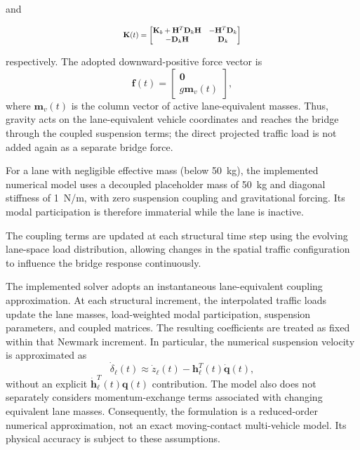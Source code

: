 \documentclass[journal]{IEEEtran}
\begin{document}
and

\begin{equation}
\scalebox{0.78}{$\displaystyle
\mathbf{K}(t)=
\begin{bmatrix}
\mathbf{K}_b+\mathbf{H}^{T}\mathbf{D}_k\mathbf{H}
&
-\mathbf{H}^{T}\mathbf{D}_k\\
-\mathbf{D}_k\mathbf{H}
&
\mathbf{D}_k
\end{bmatrix}
$}
\label{eq:assembled_stiffness}
\end{equation}

respectively. The adopted downward-positive force vector is
\begin{equation}
\mathbf{f}(t)=
\begin{bmatrix}
\mathbf{0}\\ g\mathbf{m}_v(t)
\end{bmatrix},
\label{eq:assembled_force}
\end{equation}
where $\mathbf{m}_v(t)$ is the column vector of active
lane-equivalent masses. Thus, gravity acts on the lane-equivalent
vehicle coordinates and reaches the bridge through the coupled
suspension terms; the direct projected traffic load is not added
again as a separate bridge force.

For a lane with negligible effective mass (below 50~kg),
the implemented numerical model uses a decoupled placeholder
mass of 50~kg and diagonal stiffness of 1~N/m, with zero
suspension coupling and gravitational forcing. Its modal
participation is therefore immaterial while the lane is inactive.


The coupling terms are updated at each structural time step using the evolving lane-space load distribution, allowing changes in the spatial traffic configuration to influence the bridge response continuously.


The implemented solver adopts an instantaneous lane-equivalent
coupling approximation. At each structural increment, the
interpolated traffic loads update the lane masses, load-weighted
modal participation, suspension parameters, and coupled matrices.
The resulting coefficients are treated as fixed within that
Newmark increment. In particular, the numerical suspension
velocity is approximated as
\begin{equation}
\dot{\delta}_{\ell}(t)\approx
\dot{z}_{\ell}(t)-
\mathbf{h}_{\ell}^{T}(t)\dot{\mathbf{q}}(t),
\label{eq:reduced_velocity_approx}
\end{equation}
without an explicit
$\dot{\mathbf{h}}_{\ell}^{T}(t)\mathbf{q}(t)$ contribution.
The model also does not separately considers momentum-exchange
terms associated with changing equivalent lane masses.
Consequently, the formulation is a reduced-order numerical
approximation, not an exact moving-contact multi-vehicle model.
Its physical accuracy is subject to these assumptions.
\end{document}
